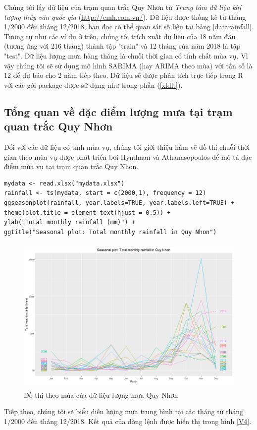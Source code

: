 \documentclass[12pt, a4paper,oneside]{book}
\theoremstyle{definition}
\begin{document}
Chúng tôi lấy dữ liệu của trạm quan trắc Quy Nhơn từ \textit{Trung tâm dữ liệu khí tượng thủy văn quốc gia} (\url{http://cmh.com.vn/}). Dữ liệu được thống kê từ tháng 1/2000 đến tháng 12/2018,  bạn đọc có thể quan sát số liệu tại bảng \ref{datarainfall}. Tương tự như các ví dụ ở trên, chúng tôi trích xuất dữ liệu của 18 năm đầu (tương ứng với 216 tháng) thành tập "train" và 12 tháng của năm 2018 là tập "test". Dữ liệu lượng mưa hàng tháng là chuỗi thời gian có tính chất mùa vụ. Vì vậy chúng tôi sẽ sử dụng mô hình SARIMA (hay ARIMA theo mùa) với tần số là 12 để dự báo cho 2 năm tiếp theo. Dữ liệu sẽ được phân tích trực tiếp trong R với các gói package được sử dụng như trong phần (\ref{xldlt}).
\subsection{Tổng quan về đặc điểm lượng mưa tại trạm quan trắc Quy Nhơn}
Đối với các dữ liệu có tính mùa vụ, chúng tôi giới thiệu hàm vẽ đồ thị chuỗi thời gian theo mùa vụ được phát triển bởi Hyndman và Athanasopoulos để mô tả đặc điểm mùa vụ tại trạm quan trắc Quy Nhơn.
\begin{lstlisting}
mydata <- read.xlsx("mydata.xlsx")
rainfall <- ts(mydata, start = c(2000,1), frequency = 12)
ggseasonplot(rainfall, year.labels=TRUE, year.labels.left=TRUE) +
theme(plot.title = element_text(hjust = 0.5)) +  
ylab("Total monthly rainfall (mm)") +
ggtitle("Seasonal plot: Total monthly rainfall in Quy Nhon")
\end{lstlisting}
\begin{figure}[!htb]
	\centering
	\includegraphics[width=1\linewidth,height=7.7cm]{anh/V2}
	\vskip-4mm 
	\caption{Đồ thị theo mùa của dữ liệu lượng mưa Quy Nhơn}  
	\label{V2}
\end{figure}
Tiếp theo, chúng tôi sẽ biểu diễn lượng mưa trung bình tại các tháng từ tháng 1/2000 đến tháng 12/2018. Kết quả của dòng lệnh được hiển thị trong hình \ref{V4}.
\end{document}
